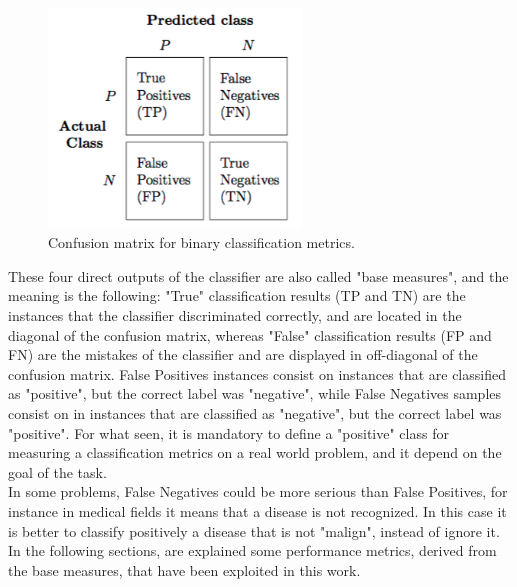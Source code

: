 \begin{figure}[ht]
	\centering
	\includegraphics[width=0.6\textwidth]{figures/confusion_matrix.png}
	\caption{Confusion matrix for binary classification metrics.}
	\label{fig:confusion-matrix}
\end{figure}

These four direct outputs of the classifier are also called "base measures", and the meaning is the following: "True" classification results (\ac{TP} and \ac{TN}) are the instances that the classifier discriminated correctly, and are located in the diagonal of the confusion matrix, whereas "False" classification results (\ac{FP} and \ac{FN}) are the mistakes of the classifier and are displayed in off-diagonal of the confusion matrix. False Positives instances consist on instances that are classified as "positive", but the correct label was "negative", while False Negatives samples consist on in instances that are classified as "negative", but the correct label was "positive". For what seen, it is mandatory to define a "positive" class for measuring a classification metrics on a real world problem, and it depend on the goal of the task.\\
In some problems, False Negatives could be more serious than False Positives, for instance in medical fields it means that a disease is not recognized. In this case it is better to classify positively a disease that is not "malign", instead of ignore it. \\
In the following sections, are explained some performance metrics, derived from the base measures, that have been exploited in this work.

